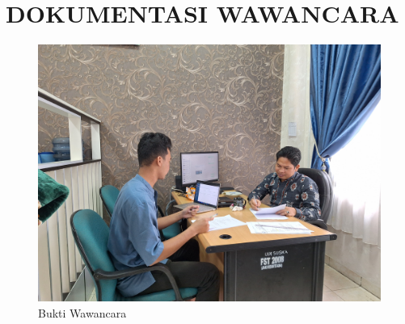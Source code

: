 %
%
%
%


\renewcommand{\thepage}{C - \arabic{page}}
\chapter{DOKUMENTASI WAWANCARA}
\begin{figure}[h]
	\centering
	\includegraphics[width=0.82\linewidth]{konten/gambar/wawancara.jpg}
	\caption{Bukti Wawancara}
	\label{fig:hasil-wawancara}
\end{figure}